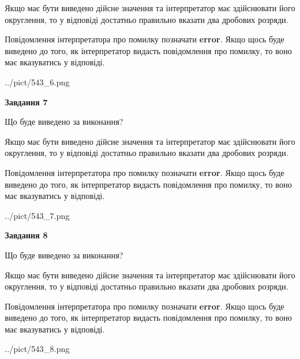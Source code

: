 \documentclass[12pt, ukrainian]{article}
\begin{document}
{\begin {Large}
Якщо має бути виведено дійсне значення та інтерпретатор має здійснювати його округлення, 
то у відповіді достатньо правильно вказати два дробових розряди.

Повідомлення інтерпретатора про помилку позначати \textbf{error}.
Якщо щось буде виведено до того, як інтерпретатор видасть повідомлення про помилку, 
то воно має вказуватись у відповіді. \par

\begin{center}
	{../pict/543_6.png}
\end{center}
\newpage

{\begin {center}\textbf{Завдання 7}\end {center}}\par
Що буде виведено за виконання? \par

Якщо має бути виведено дійсне значення та інтерпретатор має здійснювати його округлення, 
то у відповіді достатньо правильно вказати два дробових розряди.

Повідомлення інтерпретатора про помилку позначати \textbf{error}.
Якщо щось буде виведено до того, як інтерпретатор видасть повідомлення про помилку, 
то воно має вказуватись у відповіді. \par

\begin{center}
	{../pict/543_7.png}
\end{center}
\newpage

{\begin {center}\textbf{Завдання 8}\end {center}}\par
Що буде виведено за виконання? \par

Якщо має бути виведено дійсне значення та інтерпретатор має здійснювати його округлення, 
то у відповіді достатньо правильно вказати два дробових розряди.

Повідомлення інтерпретатора про помилку позначати \textbf{error}.
Якщо щось буде виведено до того, як інтерпретатор видасть повідомлення про помилку, 
то воно має вказуватись у відповіді. \par

\begin{center}
	{../pict/543_8.png}
\end{center}
\newpage


\end{Large}}
\end{document}
